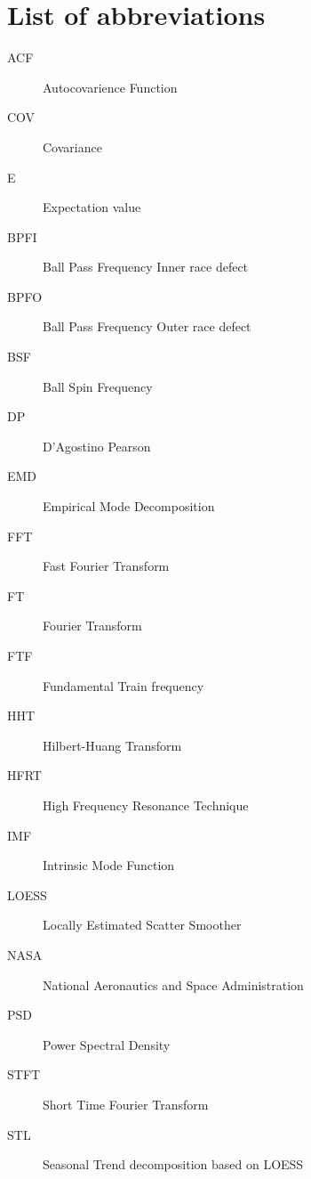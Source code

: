 \documentclass[../Main/thesis.tex]{subfiles}
\begin{document}
\chapter*{List of abbreviations}
\begin{description}
\item[ACF] Autocovarience Function
\item[COV] Covariance
\item[E] Expectation value
\item[BPFI] Ball Pass Frequency Inner race defect
\item[BPFO] Ball Pass Frequency Outer race defect
\item[BSF] Ball Spin Frequency
\item[DP] D'Agostino Pearson
\item[EMD] Empirical Mode Decomposition
\item[FFT] Fast Fourier Transform
\item[FT] Fourier Transform
\item [FTF] Fundamental Train frequency
\item[HHT] Hilbert-Huang Transform
\item [HFRT] High Frequency Resonance Technique
\item[IMF] Intrinsic Mode Function
\item[LOESS] Locally Estimated Scatter Smoother
\item[NASA] National Aeronautics and Space Administration
\item[PSD] Power Spectral Density
\item[STFT] Short Time Fourier Transform
\item[STL] Seasonal Trend decomposition based on LOESS


\end{description}

\blankpage
\end{document}
